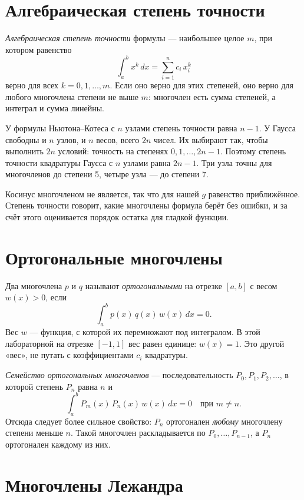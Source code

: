 \documentclass[11pt,a4paper]{article}
\begin{document}
\section*{Алгебраическая степень точности}

\emph{Алгебраическая степень точности} формулы --- наибольшее целое \(m\),
при котором равенство
\[
\int_{a}^{b} x^{k}\, dx = \sum_{i=1}^{n} c_{i}\, x_{i}^{k}
\]
верно для всех \(k = 0, 1, \ldots, m\).
Если оно верно для этих степеней, оно верно для любого многочлена степени не выше \(m\):
многочлен есть сумма степеней, а интеграл и сумма линейны.

У формулы Ньютона--Котеса с \(n\) узлами степень точности равна \(n - 1\).
У Гаусса свободны и \(n\) узлов, и \(n\) весов, всего \(2n\) чисел.
Их выбирают так, чтобы выполнить \(2n\) условий: точность на степенях
\(0, 1, \ldots, 2n - 1\). Поэтому степень точности квадратуры Гаусса с \(n\) узлами равна \(2n - 1\).
Три узла точны для многочленов до степени 5, четыре узла --- до степени 7.

Косинус многочленом не является, так что для нашей \(g\) равенство приближённое.
Степень точности говорит, какие многочлены формула берёт без ошибки,
и за счёт этого оценивается порядок остатка для гладкой функции.

\section*{Ортогональные многочлены}

Два многочлена \(p\) и \(q\) называют \emph{ортогональными} на отрезке \([a, b]\) с весом \(w(x) > 0\), если
\[
\int_{a}^{b} p(x)\, q(x)\, w(x)\, dx = 0.
\]
Вес \(w\) --- функция, с которой их перемножают под интегралом.
В этой лабораторной на отрезке \([-1, 1]\) вес равен единице: \(w(x) = 1\).
Это другой «вес», не путать с коэффициентами \(c_{i}\) квадратуры.

\emph{Семейство ортогональных многочленов} --- последовательность \(P_{0}, P_{1}, P_{2}, \ldots\),
в которой степень \(P_{n}\) равна \(n\) и
\[
\int_{a}^{b} P_{m}(x)\, P_{n}(x)\, w(x)\, dx = 0
\quad\text{при } m \neq n.
\]
Отсюда следует более сильное свойство: \(P_{n}\) ортогонален \emph{любому} многочлену
степени меньше \(n\). Такой многочлен раскладывается по \(P_{0}, \ldots, P_{n-1}\),
а \(P_{n}\) ортогонален каждому из них.

\section*{Многочлены Лежандра}
\end{document}

